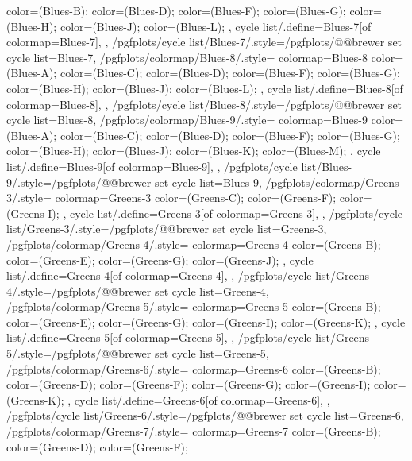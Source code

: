 {{{      color=(Blues-B);
      color=(Blues-D);
      color=(Blues-F);
      color=(Blues-G);
      color=(Blues-H);
      color=(Blues-J);
      color=(Blues-L);
    },
    cycle list/.define={Blues-7}{[of colormap=Blues-7]},
  },
  /pgfplots/cycle list/Blues-7/.style={/pgfplots/@@brewer set cycle list={Blues-7}},
  /pgfplots/colormap/Blues-8/.style={
    colormap={Blues-8}{
      color=(Blues-A);
      color=(Blues-C);
      color=(Blues-D);
      color=(Blues-F);
      color=(Blues-G);
      color=(Blues-H);
      color=(Blues-J);
      color=(Blues-L);
    },
    cycle list/.define={Blues-8}{[of colormap=Blues-8]},
  },
  /pgfplots/cycle list/Blues-8/.style={/pgfplots/@@brewer set cycle list={Blues-8}},
  /pgfplots/colormap/Blues-9/.style={
    colormap={Blues-9}{
      color=(Blues-A);
      color=(Blues-C);
      color=(Blues-D);
      color=(Blues-F);
      color=(Blues-G);
      color=(Blues-H);
      color=(Blues-J);
      color=(Blues-K);
      color=(Blues-M);
    },
    cycle list/.define={Blues-9}{[of colormap=Blues-9]},
  },
  /pgfplots/cycle list/Blues-9/.style={/pgfplots/@@brewer set cycle list={Blues-9}},
  /pgfplots/colormap/Greens-3/.style={
    colormap={Greens-3}{
      color=(Greens-C);
      color=(Greens-F);
      color=(Greens-I);
    },
    cycle list/.define={Greens-3}{[of colormap=Greens-3]},
  },
  /pgfplots/cycle list/Greens-3/.style={/pgfplots/@@brewer set cycle list={Greens-3}},
  /pgfplots/colormap/Greens-4/.style={
    colormap={Greens-4}{
      color=(Greens-B);
      color=(Greens-E);
      color=(Greens-G);
      color=(Greens-J);
    },
    cycle list/.define={Greens-4}{[of colormap=Greens-4]},
  },
  /pgfplots/cycle list/Greens-4/.style={/pgfplots/@@brewer set cycle list={Greens-4}},
  /pgfplots/colormap/Greens-5/.style={
    colormap={Greens-5}{
      color=(Greens-B);
      color=(Greens-E);
      color=(Greens-G);
      color=(Greens-I);
      color=(Greens-K);
    },
    cycle list/.define={Greens-5}{[of colormap=Greens-5]},
  },
  /pgfplots/cycle list/Greens-5/.style={/pgfplots/@@brewer set cycle list={Greens-5}},
  /pgfplots/colormap/Greens-6/.style={
    colormap={Greens-6}{
      color=(Greens-B);
      color=(Greens-D);
      color=(Greens-F);
      color=(Greens-G);
      color=(Greens-I);
      color=(Greens-K);
    },
    cycle list/.define={Greens-6}{[of colormap=Greens-6]},
  },
  /pgfplots/cycle list/Greens-6/.style={/pgfplots/@@brewer set cycle list={Greens-6}},
  /pgfplots/colormap/Greens-7/.style={
    colormap={Greens-7}{
      color=(Greens-B);
      color=(Greens-D);
      color=(Greens-F);
}}}
